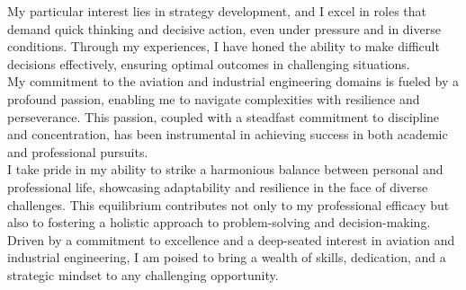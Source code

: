 \documentclass[
	a4paper,
]{fortysecondscv}
\begin{document}
\begin{cvtable}[3]
	\end{cvtable}
 
\begin{cvtable}[1.5]
\end{cvtable}

\newpage
\makebacksidebar
{My particular interest lies in strategy development, and I excel in roles that demand quick thinking and decisive action, even under pressure and in diverse conditions. Through my experiences, I have honed the ability to make difficult decisions effectively, ensuring optimal outcomes in challenging situations.}\vspace{10pt}
\\ 
{My commitment to the aviation and industrial engineering domains is fueled by a profound passion, enabling me to navigate complexities with resilience and perseverance. This passion, coupled with a steadfast commitment to discipline and concentration, has been instrumental in achieving success in both academic and professional pursuits.}\vspace{10pt}
\\
{I take pride in my ability to strike a harmonious balance between personal and professional life, showcasing adaptability and resilience in the face of diverse challenges. This equilibrium contributes not only to my professional efficacy but also to fostering a holistic approach to problem-solving and decision-making.}\vspace{10pt}
\\
{Driven by a commitment to excellence and a deep-seated interest in aviation and industrial engineering, I am poised to bring a wealth of skills, dedication, and a strategic mindset to any challenging opportunity.}
\end{document}
